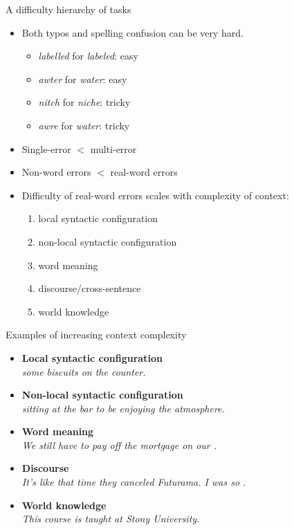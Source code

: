 \documentclass[professionalfonts, xcolor={usenames,svgnames,x11names,table}]{beamer}
\begin{document}
\begin{frame}{A difficulty hierarchy of tasks}
    \begin{itemize}
        \item Both typos and spelling confusion can be very hard.
            \begin{itemize}
                \item \emph{labelled} for \emph{labeled}: easy
                \item \emph{awter} for \emph{water}: easy
                \item \emph{nitch} for \emph{niche}: tricky
                \item \emph{awre} for \emph{water}: tricky
            \end{itemize}
        \item Single-error $<$ multi-error
        \item Non-word errors $<$ real-word errors
        \item Difficulty of real-word errors scales with complexity of context:
            \begin{enumerate}
                \item local syntactic configuration
                \item non-local syntactic configuration
                \item word meaning
                \item discourse\slash cross-sentence
                \item world knowledge
            \end{enumerate}
    \end{itemize}
\end{frame}

\begin{frame}{Examples of increasing context complexity}
    \begin{itemize}
        \item \textbf{Local syntactic configuration}\\
              \emph{  some biscuits on the counter.}
        \item \textbf{Non-local syntactic configuration}\\
              \emph{ sitting at the bar  to be enjoying the atmosphere.}
        \item \textbf{Word meaning}\\
              \emph{We still have to pay off the mortgage on our .}
        \item \textbf{Discourse}\\
              \emph{It's like that time they canceled Futurama. I was so .}
        \item \textbf{World knowledge}\\
              \emph{This course is taught at Stony  University.}
    \end{itemize}
\end{frame}
\end{document}

